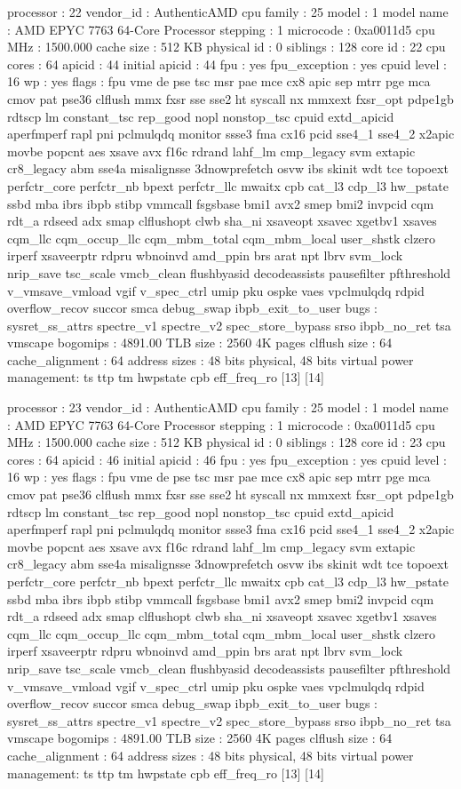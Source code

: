 processor	: 22
vendor_id	: AuthenticAMD
cpu family	: 25
model		: 1
model name	: AMD EPYC 7763 64-Core Processor
stepping	: 1
microcode	: 0xa0011d5
cpu MHz		: 1500.000
cache size	: 512 KB
physical id	: 0
siblings	: 128
core id		: 22
cpu cores	: 64
apicid		: 44
initial apicid	: 44
fpu		: yes
fpu_exception	: yes
cpuid level	: 16
wp		: yes
flags		: fpu vme de pse tsc msr pae mce cx8 apic sep mtrr pge mca cmov pat pse36 clflush mmx fxsr sse sse2 ht syscall nx mmxext fxsr_opt pdpe1gb rdtscp lm constant_tsc rep_good nopl nonstop_tsc cpuid extd_apicid aperfmperf rapl pni pclmulqdq monitor ssse3 fma cx16 pcid sse4_1 sse4_2 x2apic movbe popcnt aes xsave avx f16c rdrand lahf_lm cmp_legacy svm extapic cr8_legacy abm sse4a misalignsse 3dnowprefetch osvw ibs skinit wdt tce topoext perfctr_core perfctr_nb bpext perfctr_llc mwaitx cpb cat_l3 cdp_l3 hw_pstate ssbd mba ibrs ibpb stibp vmmcall fsgsbase bmi1 avx2 smep bmi2 invpcid cqm rdt_a rdseed adx smap clflushopt clwb sha_ni xsaveopt xsavec xgetbv1 xsaves cqm_llc cqm_occup_llc cqm_mbm_total cqm_mbm_local user_shstk clzero irperf xsaveerptr rdpru wbnoinvd amd_ppin brs arat npt lbrv svm_lock nrip_save tsc_scale vmcb_clean flushbyasid decodeassists pausefilter pfthreshold v_vmsave_vmload vgif v_spec_ctrl umip pku ospke vaes vpclmulqdq rdpid overflow_recov succor smca debug_swap ibpb_exit_to_user
bugs		: sysret_ss_attrs spectre_v1 spectre_v2 spec_store_bypass srso ibpb_no_ret tsa vmscape
bogomips	: 4891.00
TLB size	: 2560 4K pages
clflush size	: 64
cache_alignment	: 64
address sizes	: 48 bits physical, 48 bits virtual
power management: ts ttp tm hwpstate cpb eff_freq_ro [13] [14]

processor	: 23
vendor_id	: AuthenticAMD
cpu family	: 25
model		: 1
model name	: AMD EPYC 7763 64-Core Processor
stepping	: 1
microcode	: 0xa0011d5
cpu MHz		: 1500.000
cache size	: 512 KB
physical id	: 0
siblings	: 128
core id		: 23
cpu cores	: 64
apicid		: 46
initial apicid	: 46
fpu		: yes
fpu_exception	: yes
cpuid level	: 16
wp		: yes
flags		: fpu vme de pse tsc msr pae mce cx8 apic sep mtrr pge mca cmov pat pse36 clflush mmx fxsr sse sse2 ht syscall nx mmxext fxsr_opt pdpe1gb rdtscp lm constant_tsc rep_good nopl nonstop_tsc cpuid extd_apicid aperfmperf rapl pni pclmulqdq monitor ssse3 fma cx16 pcid sse4_1 sse4_2 x2apic movbe popcnt aes xsave avx f16c rdrand lahf_lm cmp_legacy svm extapic cr8_legacy abm sse4a misalignsse 3dnowprefetch osvw ibs skinit wdt tce topoext perfctr_core perfctr_nb bpext perfctr_llc mwaitx cpb cat_l3 cdp_l3 hw_pstate ssbd mba ibrs ibpb stibp vmmcall fsgsbase bmi1 avx2 smep bmi2 invpcid cqm rdt_a rdseed adx smap clflushopt clwb sha_ni xsaveopt xsavec xgetbv1 xsaves cqm_llc cqm_occup_llc cqm_mbm_total cqm_mbm_local user_shstk clzero irperf xsaveerptr rdpru wbnoinvd amd_ppin brs arat npt lbrv svm_lock nrip_save tsc_scale vmcb_clean flushbyasid decodeassists pausefilter pfthreshold v_vmsave_vmload vgif v_spec_ctrl umip pku ospke vaes vpclmulqdq rdpid overflow_recov succor smca debug_swap ibpb_exit_to_user
bugs		: sysret_ss_attrs spectre_v1 spectre_v2 spec_store_bypass srso ibpb_no_ret tsa vmscape
bogomips	: 4891.00
TLB size	: 2560 4K pages
clflush size	: 64
cache_alignment	: 64
address sizes	: 48 bits physical, 48 bits virtual
power management: ts ttp tm hwpstate cpb eff_freq_ro [13] [14]

